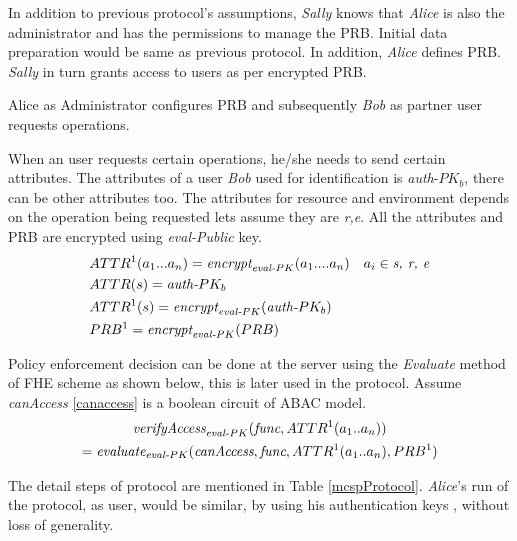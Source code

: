 \documentclass[conference]{IEEEtran}
\numberwithin{equation}{section}
\begin{document}
In addition to previous protocol's assumptions, \emph{Sally} knows that \emph{Alice} is also the administrator and has the permissions to  manage the PRB. Initial data preparation would be same as previous protocol. In addition, \emph{Alice} defines PRB. \emph{Sally} in turn grants access to users as per encrypted PRB.

 Alice as Administrator configures PRB and subsequently \emph{Bob} as partner user requests operations. 
  
  When an user requests certain operations, he/she needs to send certain attributes. The attributes of a user \emph{Bob} used for identification is {\emph{auth}-$PK_b$}, there can be other attributes too. The attributes for resource and environment depends on the operation being requested lets assume they are \emph{r,e}. All the attributes and PRB are encrypted using \emph{eval-Public} key.
\begin{subequations}\label{eattr}
\begin{align}
&ATTR^1(a_1 ... a_n) = \emph{encrypt}_{\emph{eval}\textit{-}PK}(a_1 .... a_n) \quad a_i \in \emph{s, r, e}\label{at3}\\
&ATTR(s) = \emph{auth}\textit{-}PK_b \label{at1} \\ 
&ATTR^1(s) = \emph{encrypt}_{\emph{eval}\textit{-}PK}(\emph{auth}\textit{-}PK_b)\label{at2}\\
&PRB^1 = \emph{encrypt}_{\emph{eval}\textit{-}PK}(PRB)\label{pbr}
\end{align}
\end{subequations}

 Policy enforcement decision can be done at the server using the \emph{Evaluate} method of FHE scheme as shown below, this is later used in the protocol. Assume \emph{canAccess} \eqref{canaccess} is a boolean circuit of ABAC model.
\begin{multline} \label{access}
\emph{verifyAccess}_{\emph{eval}\textit{-}PK}(\emph{func}, ATTR^1(a_1 .. a_n)) \\ = \emph{evaluate}_{\emph{eval}\textit{-}PK}(\emph{canAccess},\emph{func},ATTR^1(a_1 .. a_n),PRB^1)
\end{multline}

The detail steps of protocol are mentioned in Table  \ref{mcspProtocol}.  \emph{Alice}'s run of the protocol, as user, would be similar, by using his authentication keys ,  without loss of generality.
\end{document}

